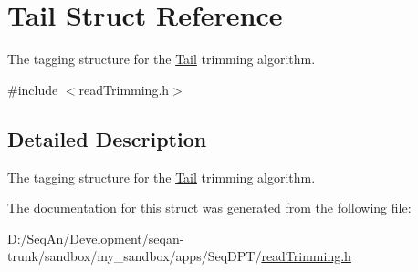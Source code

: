 \hypertarget{struct_tail}{\section{Tail Struct Reference}
\label{struct_tail}
}


The tagging structure for the \hyperlink{struct_tail}{Tail} trimming algorithm.  




{\ttfamily \#include $<$read\-Trimming.\-h$>$}



\subsection{Detailed Description}
The tagging structure for the \hyperlink{struct_tail}{Tail} trimming algorithm. 

The documentation for this struct was generated from the following file\-:\begin{DoxyCompactItemize}
\item 
D\-:/\-Seq\-An/\-Development/seqan-\/trunk/sandbox/my\-\_\-sandbox/apps/\-Seq\-D\-P\-T/\hyperlink{read_trimming_8h}{read\-Trimming.\-h}\end{DoxyCompactItemize}
